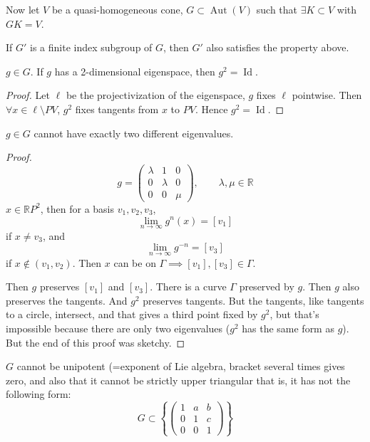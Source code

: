 Now let $V$ be a quasi-homogeneous cone,
$G\subset \operatorname{Aut}(V)$ such that
$\exists K\subset V$ with $GK=V$.

If $G'$ is a finite index subgroup of $G$,
then $G'$ also satisfies the property above.

\begin{lemma}
\label{lemma-frolov-eigenspace}
$g \in G$. If $g$ has a 2-dimensional
eigenspace, then $g^2=\operatorname{Id}$.
\end{lemma}

\begin{proof}
Let $\ell$ be the projectivization of the
eigenspace, $g$ fixes $\ell$ pointwise. Then
$\forall x\in\ell\setminus PV$, $g^2$ fixes
tangents from $x$ to $PV$. Hence
$g^2=\operatorname{Id}$.
\end{proof}

\begin{lemma}
\label{lemma-frolov-two-eigenvalues}
$g\in G$ cannot have exactly two different
eigenvalues.
\end{lemma}

\begin{proof}
$$g=\begin{pmatrix} \lambda &1&0\\0& \lambda&
0\\0 &0& \mu \end{pmatrix} ,\qquad
\lambda,\mu \in\mathbb{R}$$
$x \in \mathbb{R}P^{2}$, then for a basis
$v_1,v_2,v_3$,
$$\lim_{n \to \infty} g^n(x)=[v_1]$$
if $x\neq v_3$, and
$$\lim_{n \to \infty} g^{-n}=[v_3]$$
if $x \not\in(v_1,v_2)$.
Then $x$ can be on $\Gamma \implies
[v_1],[v_3]\in\Gamma$.

Then $g$ preserves $[v_1]$ and $[v_3]$. There
is a curve $\Gamma$ preserved by $g$. Then
$g$ also preserves the tangents. And $g^2$
preserves tangents. But the tangents, like
tangents to a circle, intersect, and that
gives a third point fixed by $g^2$, but
that's impossible because there are only two
eigenvalues ($g^2$ has the same form as $g$).
But the end of this proof was sketchy.
\end{proof}

\begin{lemma}
\label{lemma-frolov-unipotent}
$G$ cannot be unipotent (=exponent of Lie
algebra, bracket several times gives zero,
and also that it cannot be strictly upper
triangular that is, it has not the following
form:
$$G\subset \left\{ \begin{pmatrix} 1 & a &
b\\ 0 & 1 & c\\ 0 & 0 & 1 \end{pmatrix}
\right\}$$
\end{lemma}

